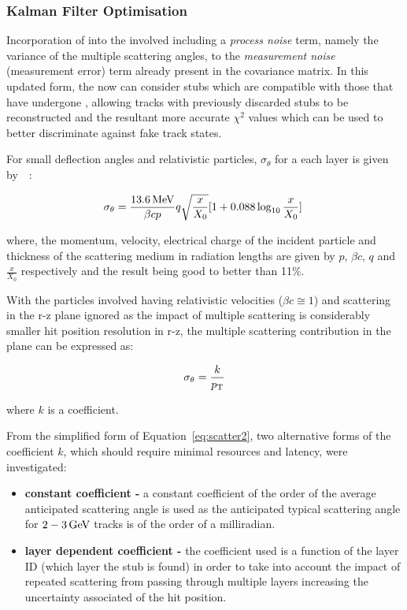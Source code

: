 \subsubsection{Kalman Filter Optimisation}\label{subsubsec:lowPtOptKF}
Incorporation of \MS into the \KF involved including a \emph{process noise} term, namely the variance of the multiple scattering angles, to the \emph{measurement noise} (\ie measurement error) term already present in the \KF covariance matrix.
In this updated form, the \KF now can consider stubs which are compatible with those that have undergone \MS, allowing tracks with previously discarded stubs to be reconstructed and the resultant more accurate $\chi^{2}$ values which can be used to better discriminate against fake track states.

For small deflection angles and relativistic particles, $\sigma_{\theta}$ for a each layer is given by~\cite{Lynch:1990sq}~:

\begin{equation}
\sigma_{\theta} = \frac{13.6\,\text{Me\hspace{-.08em}V}}{\beta c p} q \sqrt{\frac{x}{X_{0}}} [1 + 0.088 \log_{10}{\frac{x}{X_{0}}}]  \;
\label{eq:scatter1}
\end{equation}

where, the momentum, velocity, electrical charge of the incident particle and thickness of the scattering medium in radiation lengths are given by $p$, $\beta c$, $q$ and $\frac{x}{X_{0}}$ respectively and the result being good to better than 11\%.

With the particles involved having relativistic velocities (\ie $\beta c \cong 1$) and scattering in the r-z plane ignored as the impact of multiple scattering is considerably smaller hit position resolution in r-z, the multiple scattering contribution in the \rphi plane can be expressed as:

\begin{equation}
\sigma_{\theta} = \frac{k}{p_{\mathrm{T}}}
\label{eq:scatter2}
\end{equation}

where $k$ is a coefficient.

From the simplified form of Equation~\ref{eq:scatter2}, two alternative forms of the coefficient $k$, which should require minimal resources and latency, were investigated:

\begin{itemize}
\item \textbf{constant coefficient - } a constant coefficient of the order of the average anticipated scattering angle is used as the anticipated typical scattering angle for $2-3\,\text{Ge\hspace{-.08em}V}$ tracks is of the order of a milliradian.
\item \textbf{layer dependent coefficient -} the coefficient used is a function of the layer ID (\ie which layer the stub is found) in order to take into account the impact of repeated scattering from passing through multiple layers increasing the uncertainty associated of the hit position.
\end{itemize}

